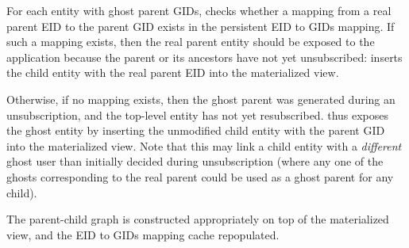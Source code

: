 For each entity with ghost parent GIDs, \sys checks whether a mapping
from a real parent EID to the parent GID exists in the persistent EID to GIDs mapping. 
If such a mapping exists, then the real parent entity should be exposed to the application because
the parent or its ancestors have not yet unsubscribed: \sys inserts the child entity with the real parent
EID into the materialized view.

Otherwise, if no mapping exists, then the ghost parent was generated during an unsubscription, and
the top-level entity has not yet resubscribed. \sys thus exposes the ghost entity by inserting the
unmodified child entity with the parent GID into the materialized view.
Note that this may link a child entity with a \emph{different} ghost user than initially decided
during unsubscription (where any one of the ghosts corresponding to the real parent could be used as
a ghost parent for any child). 

The parent-child graph is constructed appropriately on top of the materialized view, and the EID to
GIDs mapping cache repopulated.

